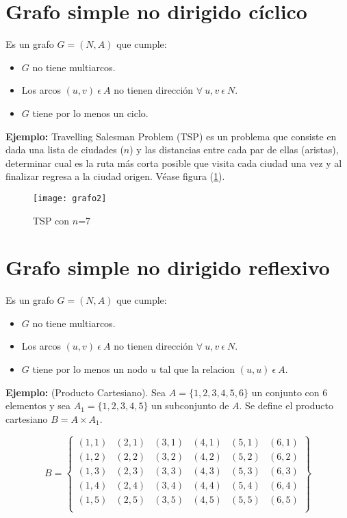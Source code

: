 \documentclass[a4paper, 11pt]{article}
\begin{document}


\section*{Grafo simple no dirigido cíclico}

Es un grafo $G = (N, A)$ que cumple:
\begin{itemize}
\item $G$ no tiene multiarcos.
\item Los arcos $(u, v) \ \epsilon \ A$ no tienen dirección $\forall \ u, v \ \epsilon \ N$.
\item $G$ tiene por lo menos un ciclo.
\end{itemize}


\textbf{Ejemplo:} Travelling Salesman Problem (TSP) es un problema que consiste en dada una lista de ciudades ($n$) y las distancias entre cada par de ellas (aristas), determinar cual es la ruta más corta posible que visita cada ciudad una vez y al finalizar regresa a la ciudad origen. Véase figura (\ref{imagen2}).

\begin{figure}[H]
  \centering
    \texttt{[image: grafo2]}
  \caption{TSP con $n$=7}
  \label{imagen2}
\end{figure}




\section*{Grafo simple no dirigido reflexivo}

Es un grafo $G = (N, A)$ que cumple:
\begin{itemize}
\item $G$ no tiene multiarcos.
\item Los arcos $(u, v) \ \epsilon \ A$ no tienen dirección $\forall \ u, v \ \epsilon \ N$.
\item $G$ tiene por lo menos un nodo $u$ tal que la relacion $(u, u) \ \epsilon \ A$.
\end{itemize}


\textbf{Ejemplo:} (Producto Cartesiano). Sea $A = \{1, 2, 3, 4, 5, 6 \}$ un conjunto con 6 elementos y sea $A_{1} = \{1, 2, 3, 4, 5 \}$ un subconjunto de $A$. Se define el producto cartesiano $B = A \times A_{1}$.

 \[
   B = 
 \left \{ {\begin{array}{cccccc}
   (1,1) & (2,1) & (3,1) & (4,1) & (5,1) & (6,1) \\
   (1,2) &(2,2) &(3,2) &(4,2) &(5,2) &(6,2) \\
   (1,3) &(2,3) &(3,3) &(4,3) &(5,3) &(6,3) \\
   (1,4) &(2,4) &(3,4) &(4,4) &(5,4) &(6,4) \\  
   (1,5) &(2,5) &(3,5) &(4,5) &(5,5) &(6,5) \\
  \end{array} } \right \}
\] 
\end{document}
